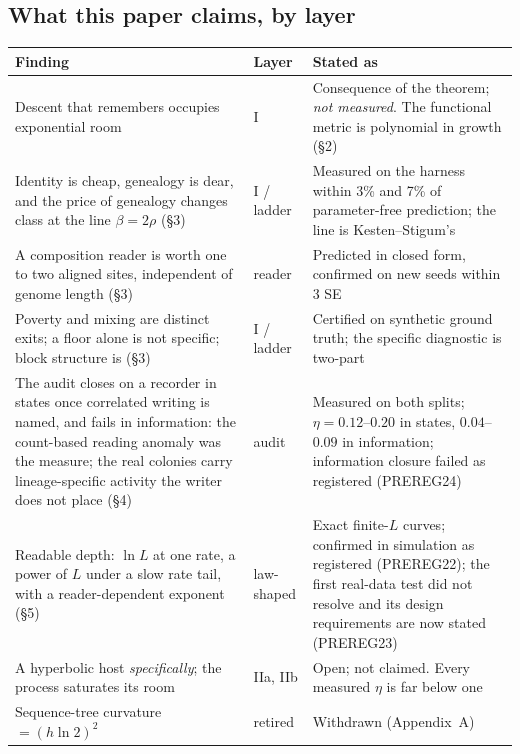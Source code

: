 \documentclass[11pt]{article}
\begin{document}
\subsection{What this paper claims, by layer}

\begin{center}\small
\begin{tabular}{@{}>{\raggedright\arraybackslash}p{5.6cm}>{\raggedright\arraybackslash}p{1.8cm}>{\raggedright\arraybackslash}p{5.6cm}@{}}
\toprule
\textbf{Finding} & \textbf{Layer} & \textbf{Stated as} \\
\midrule
Descent that remembers occupies exponential room & I & Consequence of the theorem; \emph{not measured}. The functional metric is polynomial in growth (\S2) \\
Identity is cheap, genealogy is dear, and the price of genealogy changes class at the line $\beta=2\rho$ (\S3) & I / ladder & Measured on the harness within 3\% and 7\% of parameter-free prediction; the line is Kesten--Stigum's \\
A composition reader is worth one to two aligned sites, independent of genome length (\S3) & reader & Predicted in closed form, confirmed on new seeds within 3 SE \\
Poverty and mixing are distinct exits; a floor alone is not specific; block structure is (\S3) & I / ladder & Certified on synthetic ground truth; the specific diagnostic is two-part \\
The audit closes on a recorder in states once correlated writing is named, and fails in information: the count-based reading anomaly was the measure; the real colonies carry lineage-specific activity the writer does not place (\S4) & audit & Measured on both splits; $\eta=0.12$--$0.20$ in states, $0.04$--$0.09$ in information; information closure failed as registered (PREREG24) \\
Readable depth: $\ln L$ at one rate, a power of $L$ under a slow rate tail, with a reader-dependent exponent (\S5) & law-shaped & Exact finite-$L$ curves; confirmed in simulation as registered (PREREG22); the first real-data test did not resolve and its design requirements are now stated (PREREG23) \\
A hyperbolic host \emph{specifically}; the process saturates its room & IIa, IIb & Open; not claimed. Every measured $\eta$ is far below one \\
Sequence-tree curvature $=(h\ln2)^2$ & retired & Withdrawn (Appendix~A) \\
\bottomrule
\end{tabular}
\end{center}
\end{document}
